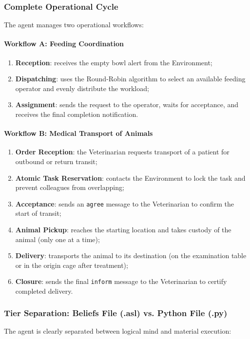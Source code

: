 \documentclass{article}
\renewcommand{\_}{\oldtextunderscore\allowbreak}
\begin{document}
\subsubsection{Complete Operational Cycle}
The agent manages two operational workflows:
\paragraph{Workflow A: Feeding Coordination}
\begin{enumerate}
    \item \textbf{Reception}: receives the empty bowl alert from the Environment;
    \item \textbf{Dispatching}: uses the Round-Robin algorithm to select an available feeding operator and evenly distribute the workload;
    \item \textbf{Assignment}: sends the request to the operator, waits for acceptance, and receives the final completion notification.
\end{enumerate}
\paragraph{Workflow B: Medical Transport of Animals}
\begin{enumerate}
    \item \textbf{Order Reception}: the Veterinarian requests transport of a patient for outbound or return transit;
    \item \textbf{Atomic Task Reservation}: contacts the Environment to lock the task and prevent colleagues from overlapping;
    \item \textbf{Acceptance}: sends an \texttt{agree} message to the Veterinarian to confirm the start of transit;
    \item \textbf{Animal Pickup}: reaches the starting location and takes custody of the animal (only one at a time);
    \item \textbf{Delivery}: transports the animal to its destination (on the examination table or in the origin cage after treatment);
    \item \textbf{Closure}: sends the final \texttt{inform} message to the Veterinarian to certify completed delivery.
\end{enumerate}
\subsubsection{Tier Separation: Beliefs File (.asl) vs. Python File (.py)}
The agent is clearly separated between logical mind and material execution:
\end{document}
